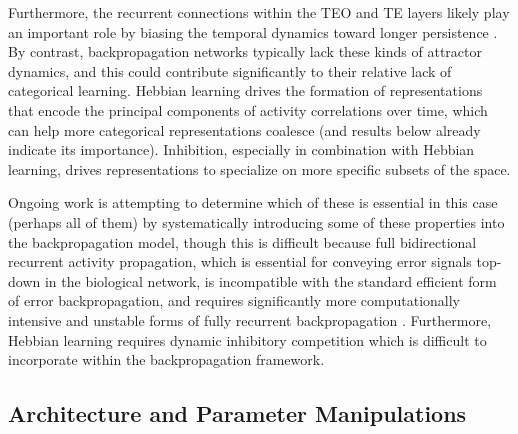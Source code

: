 \documentclass[11pt,twoside]{article}
\newif\myifpdf
\begin{document}
Furthermore, the recurrent connections within the TEO and TE layers likely play an important role by biasing the temporal dynamics toward longer persistence \citep{ChaudhuriKnoblauchGarielEtAl15}.  By contrast, backpropagation networks typically lack these kinds of attractor dynamics, and this could contribute significantly to their relative lack of categorical learning.  Hebbian learning drives the formation of representations that encode the principal components of activity correlations over time, which can help more categorical representations coalesce (and results below already indicate its importance).  Inhibition, especially in combination with Hebbian learning, drives representations to specialize on more specific subsets of the space.

Ongoing work is attempting to determine which of these is essential in this case (perhaps all of them) by systematically introducing some of these properties into the backpropagation model, though this is difficult because full bidirectional recurrent activity propagation, which is essential for conveying error signals top-down in the biological network, is incompatible with the standard efficient form of error backpropagation, and requires significantly more computationally intensive and unstable forms of fully recurrent backpropagation \citep{WilliamsZipser92,Pineda87}.  Furthermore, Hebbian learning requires dynamic inhibitory competition which is difficult to incorporate within the backpropagation framework.





\subsection{Architecture and Parameter Manipulations}
\end{document}
